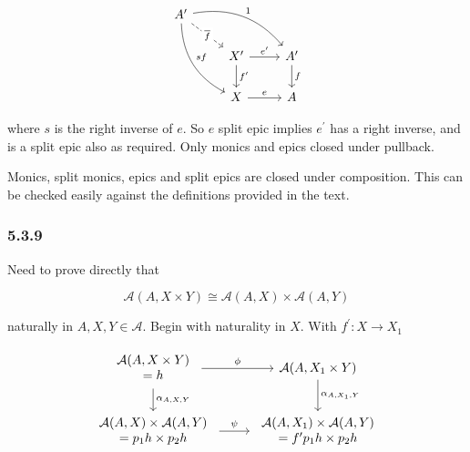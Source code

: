 \documentclass{article}
\begin{document}
\begin{equation*}
\begin{tikzcd}
A^\prime
\arrow[drr, bend left, "1"]
\arrow[ddr, bend right, "sf"]
\arrow[dr, dashed, "\overline{f}" description] & \\
& X^\prime \arrow[r, "e^\prime"] \arrow[d, "f^\prime"]
& A^\prime \arrow[d,"f"] \\
& X \arrow[r, "e"]
& A
\end{tikzcd}
\end{equation*}

where $s$ is the right inverse of $e$. So $e$ split epic implies $e^\prime$ has a right inverse, and is a split epic also as required. Only monics and epics closed under pullback.

Monics, split monics, epics and split epics are closed under composition. This can be checked easily against the definitions provided in the text.

\subsubsection*{5.3.9}

Need to prove directly that

\begin{equation*}
\mathcal{A}(A, X \times Y) \cong \mathcal{A}(A,X) \times \mathcal{A}(A,Y)
\end{equation*}

naturally in $A, X, Y \in \mathcal{A}$. Begin with naturality in $X$. With $f^\prime \colon X \rightarrow X_1$

\begin{equation}
  \label{eqn:5391}
  \begin{tikzcd}
    \begin{array}{c}
      \mathcal{A}(A, X \times Y) \\
      = h
    \end{array}
    \arrow[r, "\phi"] \arrow[d, "\alpha_{A,X,Y}"]
    & \mathcal{A}(A, X_1 \times Y) \arrow[d, "\alpha_{A,X_1,Y}"] \\
    \begin{array}{c}
      \mathcal{A}(A,X) \times \mathcal{A}(A,Y) \\
      = p_1h \times p_2h
    \end{array}
    \arrow[r, "\psi"]
    &
    \begin{array}{c}
      \mathcal{A}(A,X_1) \times \mathcal{A}(A,Y) \\
      = f^\prime p_1h \times p_2h
    \end{array}
  \end{tikzcd}
\end{equation}
\end{document}
